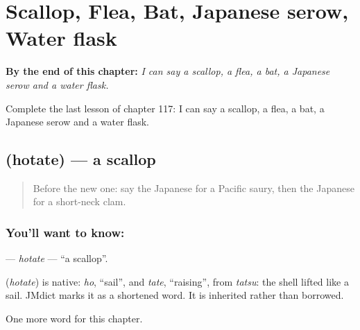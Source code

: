 
\chapter{Scallop, Flea, Bat, Japanese serow, Water flask}
\label{ch:ja-scallop-flea-bat-japanese-serow-water-flask}

\begin{chapteropening}
\textbf{By the end of this chapter:} \emph{I can say a scallop, a flea, a bat, a Japanese serow and a water flask.}

Complete the last lesson of chapter 117: I can say a scallop, a flea, a bat, a Japanese serow and a water flask.
\end{chapteropening}

\section[\texorpdfstring{\ja{ほたて} (hotate)}{ほたて (hotate)}]{ (hotate) — a scallop}

\label{lesson:JA-C117-hotate}



\begin{quote}
Before the new one: say the Japanese for a Pacific saury, then the Japanese for a short-neck clam.
\end{quote}

\subsection*{You'll want to know: }
\textbf{} — \emph{hotate} — \textquotedblleft{}a scallop\textquotedblright{}.

\begin{cousinweb}
\textbf{} (\emph{hotate}) is native: \emph{ho}, \textquotedblleft{}sail\textquotedblright{}, and \emph{tate}, \textquotedblleft{}raising\textquotedblright{}, from \emph{tatsu}: the shell lifted like a sail. JMdict marks it as a shortened word. It is inherited rather than borrowed.
\end{cousinweb}

\begin{grammarlens}[title={What you've built}]
One more word for this chapter.
\end{grammarlens}

